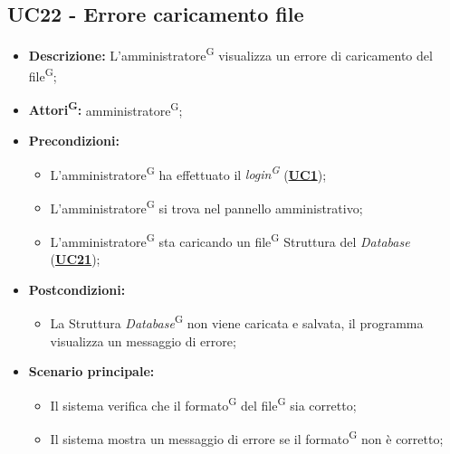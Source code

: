 \subsection{UC22 - Errore caricamento file}
\label{sec:UC22}
\begin{itemize}
	\item \textbf{Descrizione:} L’amministratore\textsuperscript{G} visualizza un errore di caricamento del file\textsuperscript{G};
	\item \textbf{Attori\textsuperscript{G}:} amministratore\textsuperscript{G};
	\item \textbf{Precondizioni:} 
	\begin{itemize}
		\item L’amministratore\textsuperscript{G} ha effettuato il \textit{login\textsuperscript{G}} (\hyperref[sec:UC1]{\textbf{UC1}});
		\item L’amministratore\textsuperscript{G} si trova nel pannello amministrativo;
		\item L’amministratore\textsuperscript{G} sta caricando un file\textsuperscript{G} Struttura del \textit{Database} (\hyperref[sec:UC21]{\textbf{UC21}});
	\end{itemize}
	\item \textbf{Postcondizioni:} 
	\begin{itemize}
		\item La Struttura \textit{Database}\textsuperscript{G} non viene caricata e salvata, il programma visualizza un messaggio di errore;
	\end{itemize}
	\item \textbf{Scenario principale:} 
	\begin{itemize}
		\item Il sistema verifica che il formato\textsuperscript{G} del file\textsuperscript{G} sia corretto;
		\item Il sistema mostra un messaggio di errore se il formato\textsuperscript{G} non è corretto;
	\end{itemize}
\end{itemize}


